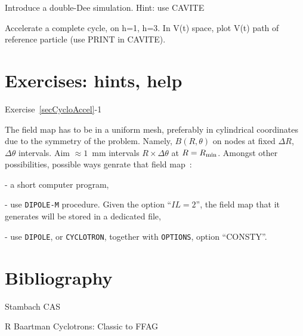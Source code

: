 Introduce a double-Dee simulation. Hint: use CAVITE

Accelerate a complete cycle, on h=1, h=3. In V(t) space, plot V(t) path of reference particle (use PRINT in CAVITE). 






\section{Exercises: hints, help}

\noindent {\small $\bullet$} Exercise~\ref{secCycloAccel}-1 

The field map has to be in a uniform mesh, preferably in cylindrical coordinates due to the symmetry of the problem.
Namely, $B(R,\theta)$ on nodes at fixed $\Delta R$, $\Delta \theta$ intervals. Aim $\approx 1$~mm intervals 
$R\times \Delta \theta$ at $R=R_{\rm min}$. Amongst other possibilities, possible ways genrate that field map~: 

- a short computer program,

- use \texttt{DIPOLE-M} procedure. Given the option ``$IL=2$'', the field map that it generates will be stored in a dedicated file,

- use \texttt{DIPOLE}, or \texttt{CYCLOTRON}, together with \texttt{OPTIONS}, option ``CONSTY''.






\section{Bibliography \label{SecBiblioCyclotron}}

Stambach CAS

R Baartman Cyclotrons: Classic to FFAG

